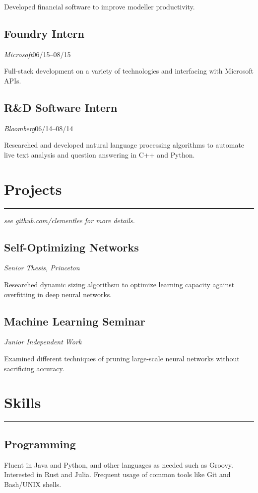 \documentclass[11pt]{article}
\begin{document}
  Developed financial software to improve modeller productivity.

  \subsection*{Foundry Intern}
  \emph{Microsoft}\hfill 06/15--08/15

  Full-stack development on a variety of technologies and interfacing with Microsoft APIs.

  \subsection*{R\&D Software Intern}
  \emph{Bloomberg}\hfill 06/14--08/14

  Researched and developed natural language processing algorithms to automate live text analysis and question answering in C++ and Python.

\section*{Projects}
\hrule
  \emph{see github.com/clementlee for more details.}
  
  \subsection*{Self-Optimizing Networks}
  \hfill\emph{Senior Thesis, Princeton}

  Researched dynamic sizing algorithsm to optimize learning capacity against overfitting in deep neural networks.

  \subsection*{Machine Learning Seminar}
  \hfill
  \emph{Junior Independent Work}

  Examined different techniques of pruning large-scale neural networks without sacrificing accuracy.

\section*{Skills}
\hrule
  \subsection*{Programming}

  Fluent in Java and Python, and other languages as needed such as Groovy.
  Interested in Rust and Julia.
  Frequent usage of common tools like Git and Bash/UNIX shells.
\end{document}
